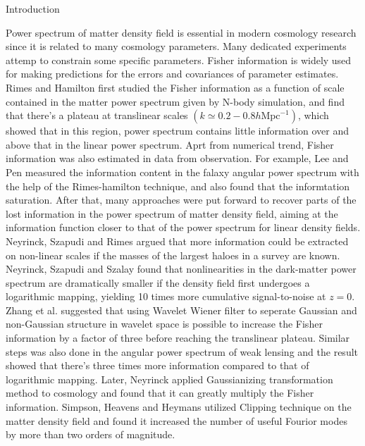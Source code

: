 \begin{section}{Introduction}
  \label{sec:introduction}  

  Power spectrum of matter density field is essential in modern cosmology research since it is related to many cosmology parameters. Many dedicated experiments attemp to constrain some specific parameters. 
  Fisher information is widely used for making predictions for the errors and covariances of parameter estimates. Rimes and Hamilton\cite{bib:Rimes2006} first studied the Fisher information as a function of scale contained in the matter power spectrum given by N-body simulation, and find that there's a plateau at translinear scales $(k \simeq 0.2-0.8 h\mathrm{Mpc}^{-1})$, which showed that in this region, power spectrum contains little information over and above that in the linear power spectrum. Aprt from numerical trend, Fisher information was also estimated in data from observation. For example, Lee and Pen \cite{bib:Lee2008} measured the information content in the falaxy angular power spectrum with the help of the Rimes-hamilton technique, and also found that the informtation saturation. 
  After that, many approaches were put forward to recover parts of the lost information in the power spectrum of matter density field, aiming at the information function closer to that of the power spectrum for linear density fields. Neyrinck, Szapudi and Rimes \cite{bib:Mark2006} argued that more information could be extracted on non-linear scales if the masses of the largest haloes in a survey are known. Neyrinck, Szapudi and Szalay \cite{bib:Mark2009} found that nonlinearities in the dark-matter power spectrum are dramatically smaller if the density field first undergoes a logarithmic mapping, yielding 10 times more cumulative signal-to-noise at $z = 0$. Zhang et al. \cite{bib:Zhang2011} suggested that using Wavelet Wiener filter to seperate Gaussian and non-Gaussian structure in wavelet space is possible to increase the Fisher information by a factor of three before reaching the translinear plateau. Similar steps was also done in the angular power spectrum of weak lensing \cite{bib:Yu2012} and the result showed that there's three times more information compared to that of logarithmic mapping. Later, Neyrinck \cite{bib:Mark2014} applied Gaussianizing transformation method to cosmology and found that it can greatly multiply the Fisher information. Simpson, Heavens and Heymans utilized Clipping \cite{bib:Fergus2013} technique on the matter density field and found it increased the number of useful Fourior modes by more than two orders of magnitude.

\end{section}
